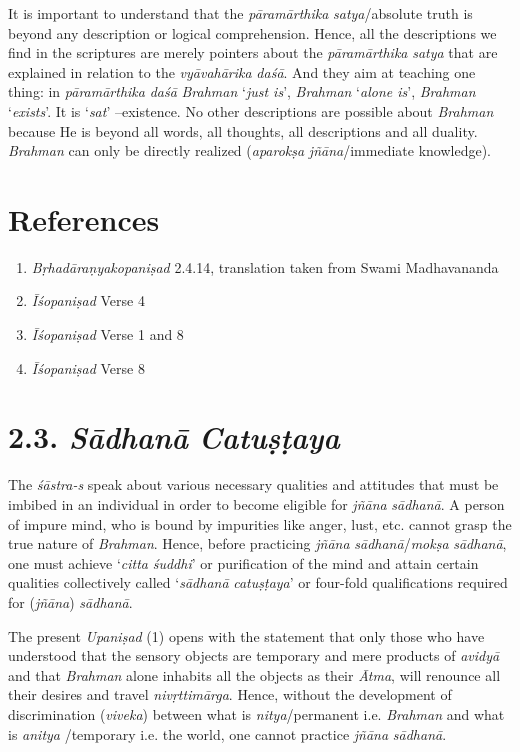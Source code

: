 It is important to understand that the \emph{pāramārthika} \emph{satya}/absolute truth is beyond any description or logical comprehension. Hence, all the descriptions we find in the scriptures are merely pointers about the \emph{pāramārthika} \emph{satya} that are explained in relation to the \emph{vyāvahārika} \emph{daśā}. And they aim at teaching one thing: in \emph{pāramārthika} \emph{daśā} \emph{Brahman} `\emph{just is}', \emph{Brahman} `\emph{alone is}', \emph{Brahman} `\emph{exists}'. It is `\emph{sat}' --existence. No other descriptions are possible about \emph{Brahman} because He is beyond all words, all thoughts, all descriptions and all duality. \emph{Brahman} can only be directly realized (\emph{aparokṣa} \emph{jñāna}/immediate knowledge).

\section*{References}

\begin{enumerate}
\itemsep=0pt
\item
  \emph{Bṛhadāraṇyakopaniṣad} 2.4.14, translation taken from Swami Madhavananda
\item
  \emph{Īśopaniṣad} Verse 4
\item
  \emph{Īśopaniṣad} Verse 1 and 8
\item
  \emph{Īśopaniṣad} Verse 8
\end{enumerate}

\section*{2.3. \emph{Sādhanā} \emph{Catuṣṭaya}}

The \emph{śāstra-s} speak about various necessary qualities and attitudes that must be imbibed in an individual in order to become eligible for \emph{jñāna} \emph{sādhanā}. A person of impure mind, who is bound by impurities like anger, lust, etc. cannot grasp the true nature of \emph{Brahman}. Hence, before practicing \emph{jñāna} \emph{sādhanā}/\emph{mokṣa} \emph{sādhanā}, one must achieve `\emph{citta} \emph{śuddhi}' or purification of the mind and attain certain qualities collectively called `\emph{sādhanā} \emph{catuṣṭaya}' or four-fold qualifications required for (\emph{jñāna}) \emph{sādhanā}.

The present \emph{Upaniṣad} (1) opens with the statement that only those who have understood that the sensory objects are temporary and mere products of \emph{avidyā} and that \emph{Brahman} alone inhabits all the objects as their \emph{Ātma}, will renounce all their desires and travel \emph{nivṛttimārga}. Hence, without the development of discrimination (\emph{viveka}) between what is \emph{nitya}/permanent i.e. \emph{Brahman} and what is \emph{anitya} /temporary i.e. the world, one cannot practice \emph{jñāna} \emph{sādhanā}.

